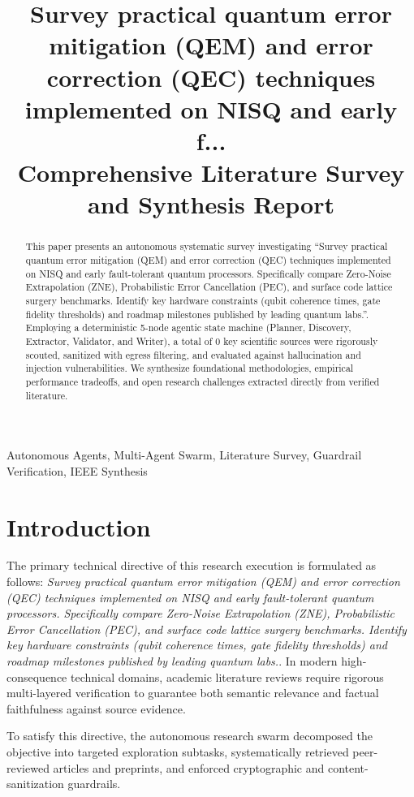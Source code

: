 \documentclass[conference]{IEEEtran}
\title{Survey practical quantum error mitigation (QEM) and error correction (QEC) techniques implemented on NISQ and early f...\\
\large Comprehensive Literature Survey and Synthesis Report}
\author{\IEEEauthorblockN{Autonomous Multi-Agent Research Swarm}
\IEEEauthorblockA{\textit{Distributed Agentic Intelligence Core} \\
Auto Research Swarm Engine \\
Synthesis Run Date: October 11, 2026 \\
\texttt{swarm-core@autoresearchswarm.com}}
}
\begin{document}
\maketitle

\begin{abstract}
This paper presents an autonomous systematic survey investigating ``Survey practical quantum error mitigation (QEM) and error correction (QEC) techniques implemented on NISQ and early fault-tolerant quantum processors. Specifically compare Zero-Noise Extrapolation (ZNE), Probabilistic Error Cancellation (PEC), and surface code lattice surgery benchmarks. Identify key hardware constraints (qubit coherence times, gate fidelity thresholds) and roadmap milestones published by leading quantum labs.''. Employing a deterministic 5-node agentic state machine (Planner, Discovery, Extractor, Validator, and Writer), a total of 0 key scientific sources were rigorously scouted, sanitized with egress filtering, and evaluated against hallucination and injection vulnerabilities. We synthesize foundational methodologies, empirical performance tradeoffs, and open research challenges extracted directly from verified literature.
\end{abstract}

\begin{IEEEkeywords}
Autonomous Agents, Multi-Agent Swarm, Literature Survey, Guardrail Verification, IEEE Synthesis
\end{IEEEkeywords}

\section{Introduction}
The primary technical directive of this research execution is formulated as follows: \textit{Survey practical quantum error mitigation (QEM) and error correction (QEC) techniques implemented on NISQ and early fault-tolerant quantum processors. Specifically compare Zero-Noise Extrapolation (ZNE), Probabilistic Error Cancellation (PEC), and surface code lattice surgery benchmarks. Identify key hardware constraints (qubit coherence times, gate fidelity thresholds) and roadmap milestones published by leading quantum labs.}. In modern high-consequence technical domains, academic literature reviews require rigorous multi-layered verification to guarantee both semantic relevance and factual faithfulness against source evidence.

To satisfy this directive, the autonomous research swarm decomposed the objective into targeted exploration subtasks, systematically retrieved peer-reviewed articles and preprints, and enforced cryptographic and content-sanitization guardrails.
\end{document}
